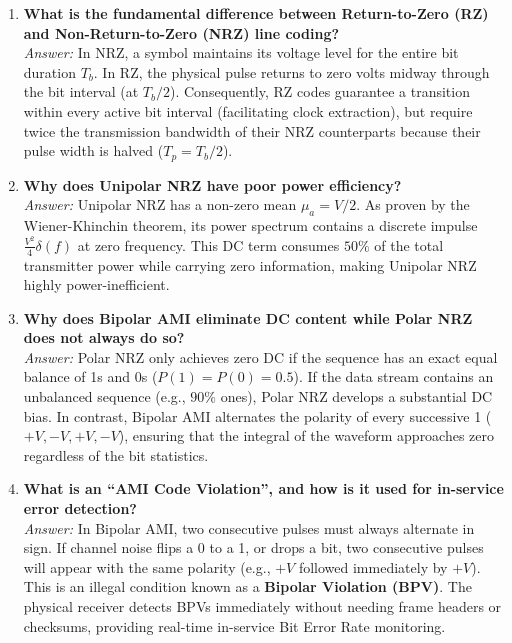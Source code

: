 \documentclass[11pt,a4paper]{article}
\begin{document}
\begin{enumerate}
    \item \textbf{What is the fundamental difference between Return-to-Zero (RZ) and Non-Return-to-Zero (NRZ) line coding?}\\
    \textit{Answer:} In NRZ, a symbol maintains its voltage level for the entire bit duration $T_b$. In RZ, the physical pulse returns to zero volts midway through the bit interval (at $T_b/2$). Consequently, RZ codes guarantee a transition within every active bit interval (facilitating clock extraction), but require twice the transmission bandwidth of their NRZ counterparts because their pulse width is halved ($T_p = T_b / 2$).

    \item \textbf{Why does Unipolar NRZ have poor power efficiency?}\\
    \textit{Answer:} Unipolar NRZ has a non-zero mean $\mu_a = V/2$. As proven by the Wiener-Khinchin theorem, its power spectrum contains a discrete impulse $\frac{V^2}{4}\delta(f)$ at zero frequency. This DC term consumes $50\%$ of the total transmitter power while carrying zero information, making Unipolar NRZ highly power-inefficient.

    \item \textbf{Why does Bipolar AMI eliminate DC content while Polar NRZ does not always do so?}\\
    \textit{Answer:} Polar NRZ only achieves zero DC if the sequence has an exact equal balance of 1s and 0s ($P(1) = P(0) = 0.5$). If the data stream contains an unbalanced sequence (e.g., $90\%$ ones), Polar NRZ develops a substantial DC bias. In contrast, Bipolar AMI alternates the polarity of every successive 1 ($+V, -V, +V, -V$), ensuring that the integral of the waveform approaches zero regardless of the bit statistics.

    \item \textbf{What is an ``AMI Code Violation'', and how is it used for in-service error detection?}\\
    \textit{Answer:} In Bipolar AMI, two consecutive pulses must always alternate in sign. If channel noise flips a 0 to a 1, or drops a bit, two consecutive pulses will appear with the same polarity (e.g., $+V$ followed immediately by $+V$). This is an illegal condition known as a \textbf{Bipolar Violation (BPV)}. The physical receiver detects BPVs immediately without needing frame headers or checksums, providing real-time in-service Bit Error Rate monitoring.


\end{enumerate}
\end{document}
